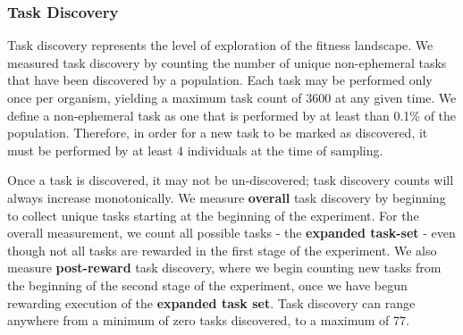 \documentclass[10pt,letterpaper,final]{article}
\begin{document}
\subsubsection*{Task Discovery}
Task discovery represents the level of exploration of the fitness landscape. We measured task discovery by counting the number of unique non-ephemeral tasks that have been discovered by a population. Each task may be performed only once per organism, yielding a maximum task count of 3600 at any given time. We define a non-ephemeral task as one that is performed by at least than 0.1\% of the population. 
Therefore, in order for a new task to be marked as discovered, it must be performed by at least 4 individuals at the time of sampling.

Once a task is discovered, it may not be un-discovered; task discovery counts will always increase monotonically. We measure \textbf{overall} task discovery by beginning to collect unique tasks starting at the beginning of the experiment. For the overall measurement, we count all possible tasks - the \textbf{expanded task-set} - even though not all tasks are rewarded in the first stage of the experiment. We also measure \textbf{post-reward} task discovery, where we begin counting new tasks from the beginning of the second stage of the experiment, once we have begun rewarding execution of the \textbf{expanded task set}. 
Task discovery can range anywhere from a minimum of zero tasks discovered, to a maximum of 77.
\end{document}
